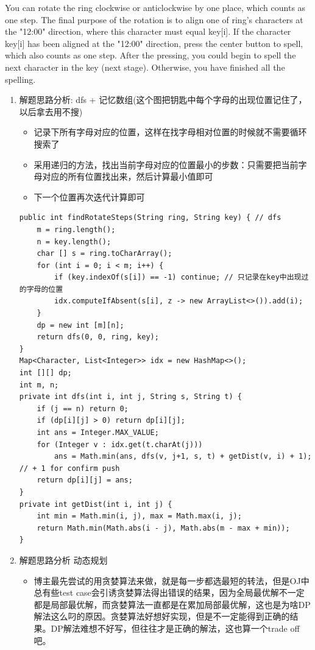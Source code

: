\documentclass[9pt, b5paaper]{book}
\begin{document}
You can rotate the ring clockwise or anticlockwise by one place, which counts as one step. The final purpose of the rotation is to align one of ring's characters at the "12:00" direction, where this character must equal key[i].
If the character key[i] has been aligned at the "12:00" direction, press the center button to spell, which also counts as one step. After the pressing, you could begin to spell the next character in the key (next stage). Otherwise, you have finished all the spelling.
\begin{enumerate}
\item 解题思路分析: dfs + 记忆数组(这个图把钥匙中每个字母的出现位置记住了，以后拿去用不搜)
\label{sec-1-4-16-1}
\begin{itemize}
\item 记录下所有字母对应的位置，这样在找字母相对位置的时候就不需要循环搜索了
\item 采用递归的方法，找出当前字母对应的位置最小的步数：只需要把当前字母对应的所有位置找出来，然后计算最小值即可
\item 下一个位置再次迭代计算即可
\end{itemize}
\begin{verbatim}
public int findRotateSteps(String ring, String key) { // dfs
    m = ring.length();
    n = key.length();
    char [] s = ring.toCharArray();
    for (int i = 0; i < m; i++) {
        if (key.indexOf(s[i]) == -1) continue; // 只记录在key中出现过的字母的位置
        idx.computeIfAbsent(s[i], z -> new ArrayList<>()).add(i);
    }
    dp = new int [m][n];
    return dfs(0, 0, ring, key);
}
Map<Character, List<Integer>> idx = new HashMap<>();
int [][] dp;
int m, n;
private int dfs(int i, int j, String s, String t) {
    if (j == n) return 0;
    if (dp[i][j] > 0) return dp[i][j];
    int ans = Integer.MAX_VALUE;
    for (Integer v : idx.get(t.charAt(j))) 
        ans = Math.min(ans, dfs(v, j+1, s, t) + getDist(v, i) + 1); // + 1 for confirm push
    return dp[i][j] = ans;
}
private int getDist(int i, int j) {
    int min = Math.min(i, j), max = Math.max(i, j);
    return Math.min(Math.abs(i - j), Math.abs(m - max + min)); 
}
\end{verbatim}
\item 解题思路分析 动态规划
\label{sec-1-4-16-2}
\begin{itemize}
\item 博主最先尝试的用贪婪算法来做，就是每一步都选最短的转法，但是OJ中总有些test case会引诱贪婪算法得出错误的结果，因为全局最优解不一定都是局部最优解，而贪婪算法一直都是在累加局部最优解，这也是为啥DP解法这么叼的原因。贪婪算法好想好实现，但是不一定能得到正确的结果。DP解法难想不好写，但往往才是正确的解法，这也算一个trade off吧。

\end{itemize}
\end{enumerate}
\end{document}
